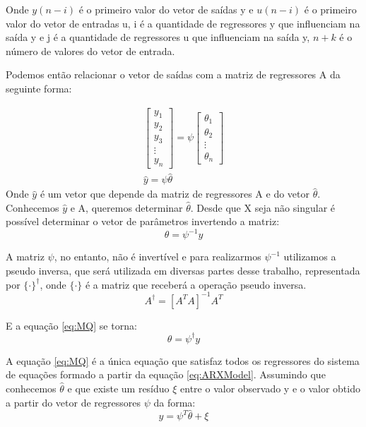 Onde $y(n-i)$ é o primeiro valor do vetor de saídas y e $u(n-i)$ é o primeiro valor do vetor de entradas u, i é a quantidade de regressores y que influenciam na saída y e j é a quantidade de regressores u que influenciam na saída y, $n+k$ é o número de valores do vetor de entrada.



Podemos então relacionar o vetor de saídas com a matriz de regressores A da seguinte forma:

\begin{equation}
\begin{array}{c}
\begin{bmatrix}
y_1 \\ y_2 \\ y_3\\ \vdots \\ y_n
\end{bmatrix}
=
\psi
\begin{bmatrix}
\theta_1 \\ \theta_2 \\ \vdots \\ \theta_n
\end{bmatrix}
\\
\hat{y}=\psi \hat{\theta}
\end{array}
\end{equation}
Onde $\hat{y}$ é um vetor que depende da matriz de regressores A e do vetor $\hat{\theta}$. Conhecemos $\hat{y}$ e A, queremos determinar $\hat{\theta}$. Desde que X seja não singular é possível determinar o vetor de parâmetros invertendo a matriz:
\begin{equation}\label{eq:MQ}
\theta=\psi^{-1}y
\end{equation}

A matriz $\psi$, no entanto, não é invertível e para realizarmos $\psi^{-1}$ utilizamos a pseudo inversa, que será utilizada em diversas partes desse trabalho, representada por $\{ \cdot\}^\dagger$, onde $\{\cdot\}$ é a matriz que receberá a operação pseudo inversa.
\begin{equation}
A^\dagger=[A^TA]^{-1}A^T
\end{equation}

E a equação \eqref{eq:MQ} se torna:
\begin{equation}\label{eq:MQ2}
\theta=\psi^\dagger y
\end{equation}


A equação \eqref{eq:MQ} é a única equação que satisfaz todos os regressores do sistema de equações formado a partir da equação \eqref{eq:ARXModel}. Assumindo que conhecemos $\hat{\theta}$ e que existe um resíduo $\xi$ entre o valor observado y e o valor obtido a partir do vetor de regressores $\psi$ da forma:
\begin{equation}\label{eq:eMQxi}
y=\psi^T\hat{\theta}+\xi
\end{equation} 

